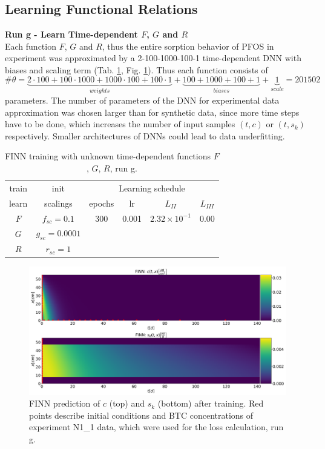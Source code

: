\subsection{Learning Functional Relations}
\textbf{Run g - Learn Time-dependent $F$, $G$ and $R$}\\
Each function $F$, $G$ and $R$, thus the entire sorption behavior of PFOS in experiment was approximated by a 2-100-1000-100-1 time-dependent DNN with biases and scaling term (Tab. \ref{tab:FGR_exp}, Fig. \ref{fig:res_ov_exp_FGR}). Thus each function consists of
\begin{equation}
   \#\theta = \underbrace{2 \cdot 100 + 100 \cdot 1000 + 1000 \cdot 100 + 100 \cdot 1}_{weights} + \underbrace{100 + 1000 + 100 + 1}_{biases} + \underbrace{1}_{scale} = 201502
\end{equation}
parameters. The number of parameters of the DNN for experimental data approximation was chosen larger than for synthetic data, since more time steps have to be done, which increases the number of input samples $(t, c)$ or $(t, s_k)$ respectively. Smaller architectures of DNNs could lead to data underfitting.
\begin{table}[h!]
    \centering
    \begin{tabular}{c|c||cccc}
    train & init & \multicolumn{4}{c}{Learning schedule}\\
    learn & scalings & epochs & lr & $L_{II}$ & $L_{III}$ \\[0.2 cm] \hline
          $F$ & $f_{sc} = 0.1$ & 300 & 0.001 & $2.32\times 10^{-1}$ & $ 0.00 $\\
          $G$ & $g_{sc} = 0.0001$ & & & &\\
          $R$ & $r_{sc} = 1$ & & & & 
        \end{tabular}
    \caption[FINN training with unknown time-dependent functions $F$, $G$, $R$, run g]{FINN training with unknown time-dependent functions $F$, $G$, $R$, run g.}
    \label{tab:FGR_exp}
\end{table}
\begin{figure}[h!]
	\centering
	\includegraphics[width=\textwidth]{images/res_ov_exp_FGR.png}
\caption[FINN predicted solution after training, run g]{FINN prediction of $c$ (top) and $s_k$ (bottom) after training.  Red points describe initial conditions and BTC concentrations of experiment N1\_1 data, which were used for the loss calculation, run g.}
\label{fig:res_ov_exp_FGR}
\end{figure}\\

